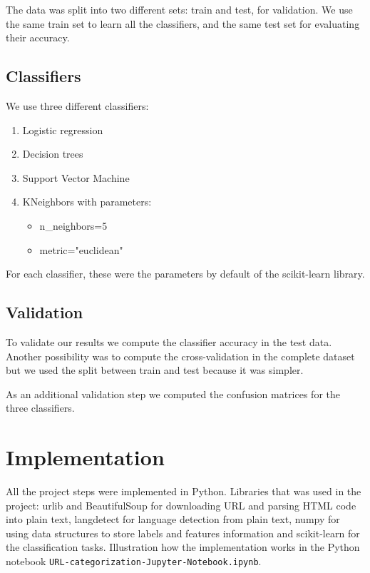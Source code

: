 \documentclass{article} %
\begin{document}
  The data was split into two different sets: train and test, for validation. We use the same train set to learn all the classifiers, and the same test set for evaluating their accuracy.


\subsection{Classifiers}

 We use three different classifiers:

  \begin{enumerate}   
    \item Logistic regression
    \item Decision trees
    \item Support Vector Machine
  	\item KNeighbors with parameters:
      \begin{itemize}
           \item n\_neighbors=5
           \item metric="euclidean" 
       \end{itemize}
   \end{enumerate}

For each classifier, these were the parameters by default of the scikit-learn library. 
 
\subsection{Validation}
 
 To validate our results we compute the classifier accuracy in the test data. Another possibility was to compute the cross-validation in the complete dataset but we used the split between train and test because it was simpler. 

 As an additional validation step we computed the confusion matrices for the three classifiers.
 
\section{Implementation}
 All the project steps were implemented in Python. Libraries that was used in the project: urlib and BeautifulSoup for downloading URL and parsing HTML code into plain text, langdetect for language detection from plain text, numpy for using data structures to store labels and features information and scikit-learn for the classification tasks. Illustration how the implementation works in the Python notebook \texttt{URL-categorization-Jupyter-Notebook.ipynb}.
\end{document}
